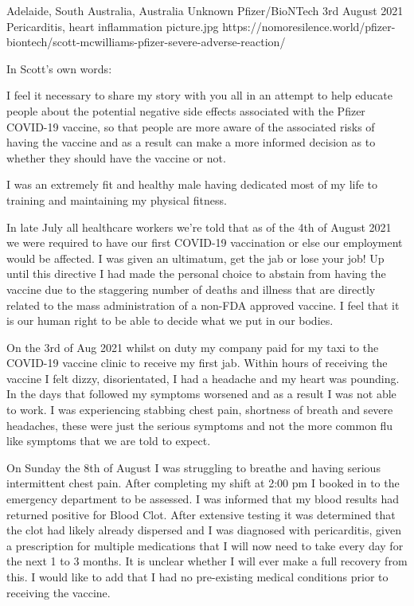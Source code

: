 {Adelaide, South Australia, Australia}
{Unknown}
{Pfizer/BioNTech}
{3rd August 2021}
{Pericarditis, heart inflammation}
{picture.jpg}
{https://nomoresilence.world/pfizer-biontech/scott-mcwilliams-pfizer-severe-adverse-reaction/}
{

\normalsize

In Scott’s own words:

I feel it necessary to share my story with you all in an attempt to help educate
people about the potential negative side effects associated with the Pfizer
COVID-19 vaccine, so that people are more aware of the associated risks of
having the vaccine and as a result can make a more informed decision as to
whether they should have the vaccine or not.

I was an extremely fit and healthy male having dedicated most of my life to
training and maintaining my physical fitness.

In late July all healthcare workers we’re told that as of the 4th of August 2021
we were required to have our first COVID-19 vaccination or else our employment
would be affected. I was given an ultimatum, get the jab or lose your job! Up
until this directive I had made the personal choice to abstain from having the
vaccine due to the staggering number of deaths and illness that are directly
related to the mass administration of a non-FDA approved vaccine. I feel that it
is our human right to be able to decide what we put in our bodies.

On the 3rd of Aug 2021 whilst on duty my company paid for my taxi to the
COVID-19 vaccine clinic to receive my first jab. Within hours of receiving the
vaccine I felt dizzy, disorientated, I had a headache and my heart was
pounding. In the days that followed my symptoms worsened and as a result I was
not able to work. I was experiencing stabbing chest pain, shortness of breath
and severe headaches, these were just the serious symptoms and not the more
common flu like symptoms that we are told to expect.

On Sunday the 8th of August I was struggling to breathe and having serious
intermittent chest pain. After completing my shift at 2:00 pm I booked in to the
emergency department to be assessed. I was informed that my blood results had
returned positive for Blood Clot. After extensive testing it was determined that
the clot had likely already dispersed and I was diagnosed with pericarditis,
given a prescription for multiple medications that I will now need to take every
day for the next 1 to 3 months. It is unclear whether I will ever make a full
recovery from this. I would like to add that I had no pre-existing medical
conditions prior to receiving the vaccine.

}
